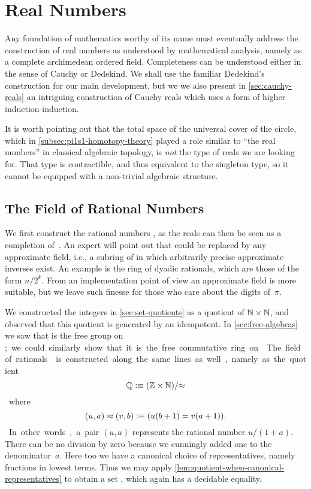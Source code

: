 \newcommand{\rclim}{\mathsf{lim}} %
\newcommand{\rcrat}{\mathsf{rat}} %
\newcommand{\rceq}{\mathsf{eq}_{\RC}} %
\newcommand{\CAP}{\mathcal{C}}    %
\newcommand{\Qp}{\Q_{+}}
\newcommand{\apart}{\mathrel{\#}}  %
\newcommand{\dcut}{\mathsf{isCut}}  %


\chapter{Real Numbers}
\label{cha:real-numbers}

Any foundation of mathematics worthy of its name must eventually address the construction
of real numbers as understood by mathematical analysis, namely as a complete archimedean
ordered field. Completeness can be understood either in the sense of Cauchy or Dedekind.
We shall use the familiar Dedekind's construction for our main development, but we we also
present in \autoref{sec:cauchy-reals} an intriguing construction of
Cauchy reals which uses a form of higher induction-induction.

It is worth pointing out that the total space of the universal cover of the circle, which
in \autoref{subsec:pi1s1-homotopy-theory} played a role similar to ``the real numbers'' in
classical algebraic topology, is \emph{not} the type of reals we are looking for. That
type is contractible, and thus equivalent to the singleton type, so it cannot be equipped
with a non-trivial algebraic structure.


\section{The Field of Rational Numbers}
\label{sec:field-rati-numb}

We first construct the rational numbers \Q, as the reals can then be seen as a completion
of~\Q. An expert will point out that \Q could be replaced by any approximate field, i.e.,
a subring of \Q in which arbitrarily precise approximate inverses exist. An example is the
ring of dyadic rationals, which are those of the form $n/2^k$. From an implementation
point of view an approximate field is more suitable, but we leave such finesse for those
who care about the digits of~$\pi$.

We constructed the integers \Z in \autoref{sec:set-quotients} as a quotient of $\mathbb{N}\times
\mathbb{N}$, and observed that this quotient is generated by an idempotent. In
\autoref{sec:free-algebras} we saw that \Z is the free group on \unit; we could similarly
show that it is the free commutative ring on \emptyt. The field of rationals \Q is
constructed along the same lines as well, namely as the quotient
%
\[ \mathbb{Q} \vcentcolon\equiv (\mathbb{Z} \times \mathbb{N})/{\approx} \]
%
where
\[ (u,a) \approx (v,b) \vcentcolon\equiv (u (b + 1) = v (a + 1)). \]
%
In other words, a pair $(u, a)$ represents the rational number $u / (1 + a)$. There can be
no division by zero because we cunningly added one to the denominator~$a$. Here too we
have a canonical choice of representatives, namely fractions in lowest terms. Thus we may
apply \autoref{lem:quotient-when-canonical-representatives} to obtain a set \Q, which
again has a decidable equality.

